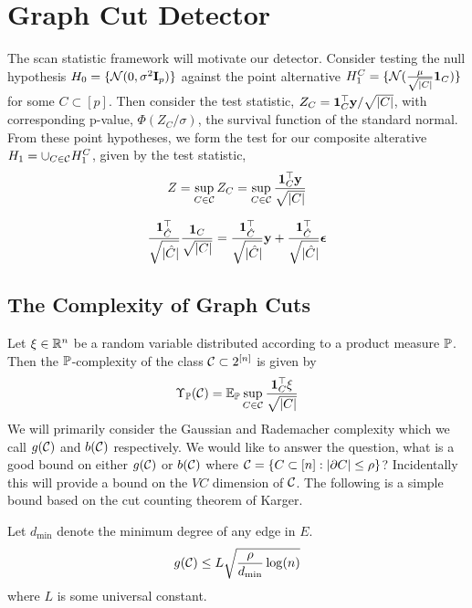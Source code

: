 \section{Graph Cut Detector}

The scan statistic framework will motivate our detector.
Consider testing the null hypothesis $H_0 = \{\mathcal{N}(0,\sigma^2 \mathbf{I}_p)\}$ against the point alternative $H_1^C = \{ \mathcal{N}( \frac{\mu}{\sqrt{|C|}} {\bf 1}_C) \}$ for some $C \subset [p]$.
Then consider the test statistic, $Z_C = {\bf 1}_C^\top \mathbf{y} / \sqrt{|C|}$, with corresponding p-value, $\Phi (Z_C/\sigma)$, the survival function of the standard normal.
From these point hypotheses, we form the test for our composite alterative $H_1 = \cup_{C \in \mathcal{C}} H_1^C$, given by the test statistic, 
\begin{equation}
\label{eq:scan_stat}
Z = \sup_{C \in \mathcal{C}} Z_C = \sup_{C \in \mathcal{C}} \frac{{\bf 1}_C^\top \mathbf{y}}{\sqrt{|C|}}
\end{equation}

\[
\begin{aligned}
\frac{{\bf 1}_{\hat C}^\top}{\sqrt{|\hat C|}} \frac{{\bf 1}_C}{\sqrt{|C|}} = \frac{{\bf 1}_{\hat C}^\top}{\sqrt{|\hat C|}} \mathbf{y} + \frac{{\bf 1}_{\hat C}^\top}{\sqrt{|\hat C|}} \bm{\epsilon}
\end{aligned}
\]

\subsection{The Complexity of Graph Cuts}

Let $\xi \in \mathbb{R}^n$ be a random variable distributed according to a product measure $\mathbb{P}$.
Then the $\mathbb{P}$-complexity of the class $\mathcal{C} \subset 2^{[n]}$ is given by
\[
\Upsilon_{\mathbb{P}}(\mathcal{C}) = \mathbb{E}_{\mathbb{P}} \sup_{C \in \mathcal{C}} \frac{{\bf 1}_C^\top \xi}{\sqrt{|C|}}
\]
We will primarily consider the Gaussian and Rademacher complexity which we call $g(\mathcal{C})$ and $b(\mathcal{C})$ respectively.
We would like to answer the question, what is a good bound on either $g(\mathcal{C})$ or $b(\mathcal{C})$ where $\mathcal{C} = \{C \subset [n] : |\partial C| \le \rho \}$?
Incidentally this will provide a bound on the $VC$ dimension of $\mathcal{C}$.
The following is a simple bound based on the cut counting theorem of Karger.

\begin{proposition}
Let $d_{\min}$ denote the minimum degree of any edge in $E$.
\[
g(\mathcal{C}) \le L \sqrt{\frac{\rho}{d_{\min}} \log(n)}
\]
where $L$ is some universal constant.
\end{proposition}

